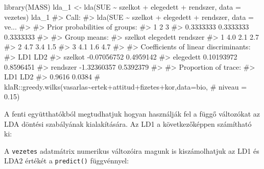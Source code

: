 \documentclass[
  letterpaper,
]{krantz}
\makeatletter
\newenvironment{Shaded}{\begin{snugshade}}{\end{snugshade}}
\newcommand{\AttributeTok}[1]{\textcolor[rgb]{0.40,0.45,0.13}{#1}}
\newcommand{\CommentTok}[1]{\textcolor[rgb]{0.37,0.37,0.37}{#1}}
\newcommand{\FunctionTok}[1]{\textcolor[rgb]{0.28,0.35,0.67}{#1}}
\newcommand{\NormalTok}[1]{\textcolor[rgb]{0.00,0.23,0.31}{#1}}
\newcommand{\OtherTok}[1]{\textcolor[rgb]{0.00,0.23,0.31}{#1}}
\newcommand{\SpecialCharTok}[1]{\textcolor[rgb]{0.37,0.37,0.37}{#1}}
\newcommand{\StringTok}[1]{\textcolor[rgb]{0.13,0.47,0.30}{#1}}
\newenvironment{kframe}{%
\medskip{}
\setlength{\fboxsep}{.8em}
 \def\at@end@of@kframe{}%
 \ifinner\ifhmode%
  \def\at@end@of@kframe{\end{minipage}}%
  \begin{minipage}{\columnwidth}%
 \fi\fi%
 \def\FrameCommand##1{\hskip\@totalleftmargin \hskip-\fboxsep
 \colorbox{shadecolor}{##1}\hskip-\fboxsep
     \hskip-\linewidth \hskip-\@totalleftmargin \hskip\columnwidth}%
 \MakeFramed {\advance\hsize-\width
   \@totalleftmargin\z@ \linewidth\hsize
   \@setminipage}}%
 {\par\unskip\endMakeFramed%
 \at@end@of@kframe}
\renewenvironment{Shaded}{\begin{kframe}}{\end{kframe}}
\makeatother
\begin{document}
\begin{Shaded}
\begin{Highlighting}[]
\FunctionTok{library}\NormalTok{(MASS)}
\NormalTok{lda\_1 }\OtherTok{\textless{}{-}} \FunctionTok{lda}\NormalTok{(SUE }\SpecialCharTok{\textasciitilde{}}\NormalTok{ szelkot }\SpecialCharTok{+}\NormalTok{ elegedett }\SpecialCharTok{+}\NormalTok{ rendszer, }\AttributeTok{data =}\NormalTok{ vezetes)}
\NormalTok{lda\_1}
\CommentTok{\#\textgreater{} Call:}
\CommentTok{\#\textgreater{} lda(SUE \textasciitilde{} szelkot + elegedett + rendszer, data = ve...}
\CommentTok{\#\textgreater{} }
\CommentTok{\#\textgreater{} Prior probabilities of groups:}
\CommentTok{\#\textgreater{}         1         2         3 }
\CommentTok{\#\textgreater{} 0.3333333 0.3333333 0.3333333 }
\CommentTok{\#\textgreater{} }
\CommentTok{\#\textgreater{} Group means:}
\CommentTok{\#\textgreater{}   szelkot elegedett rendszer}
\CommentTok{\#\textgreater{} 1     4.0       2.1      2.7}
\CommentTok{\#\textgreater{} 2     4.7       3.4      1.5}
\CommentTok{\#\textgreater{} 3     4.1       1.6      4.7}
\CommentTok{\#\textgreater{} }
\CommentTok{\#\textgreater{} Coefficients of linear discriminants:}
\CommentTok{\#\textgreater{}                   LD1       LD2}
\CommentTok{\#\textgreater{} szelkot   {-}0.07056752 0.4959142}
\CommentTok{\#\textgreater{} elegedett  0.10193972 0.8596451}
\CommentTok{\#\textgreater{} rendszer  {-}1.32360357 0.5392379}
\CommentTok{\#\textgreater{} }
\CommentTok{\#\textgreater{} Proportion of trace:}
\CommentTok{\#\textgreater{}    LD1    LD2 }
\CommentTok{\#\textgreater{} 0.9616 0.0384}
\CommentTok{\# klaR::greedy.wilks(vasarlas\textasciitilde{}ertek+attitud+fizetes+kor,data=bio,}
\CommentTok{\# niveau = 0.15)}
\end{Highlighting}
\end{Shaded}

A fenti együtthatókból megtudhatjuk hogyan használják fel a függő
változókat az LDA döntési szabályának kialakítására. Az LD1 a
következőképpen számítható ki:

A \texttt{vezetes} adatmátrix numerikus változóira magunk is
kiszámolhatjuk az LD1 és LDA2 értékét a \texttt{predict()} függvénnyel:

\begin{Shaded}
\end{Shaded}
\end{document}
